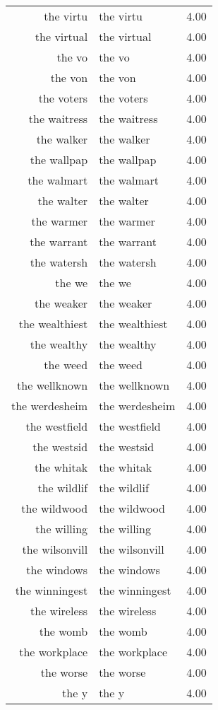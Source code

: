 \begin{table}[ht]
\begin{tabular}{rlr}
  the virtu & the virtu & 4.00 \\ 
  the virtual & the virtual & 4.00 \\ 
  the vo & the vo & 4.00 \\ 
  the von & the von & 4.00 \\ 
  the voters & the voters & 4.00 \\ 
  the waitress & the waitress & 4.00 \\ 
  the walker & the walker & 4.00 \\ 
  the wallpap & the wallpap & 4.00 \\ 
  the walmart & the walmart & 4.00 \\ 
  the walter & the walter & 4.00 \\ 
  the warmer & the warmer & 4.00 \\ 
  the warrant & the warrant & 4.00 \\ 
  the watersh & the watersh & 4.00 \\ 
  the we & the we & 4.00 \\ 
  the weaker & the weaker & 4.00 \\ 
  the wealthiest & the wealthiest & 4.00 \\ 
  the wealthy & the wealthy & 4.00 \\ 
  the weed & the weed & 4.00 \\ 
  the wellknown & the wellknown & 4.00 \\ 
  the werdesheim & the werdesheim & 4.00 \\ 
  the westfield & the westfield & 4.00 \\ 
  the westsid & the westsid & 4.00 \\ 
  the whitak & the whitak & 4.00 \\ 
  the wildlif & the wildlif & 4.00 \\ 
  the wildwood & the wildwood & 4.00 \\ 
  the willing & the willing & 4.00 \\ 
  the wilsonvill & the wilsonvill & 4.00 \\ 
  the windows & the windows & 4.00 \\ 
  the winningest & the winningest & 4.00 \\ 
  the wireless & the wireless & 4.00 \\ 
  the womb & the womb & 4.00 \\ 
  the workplace & the workplace & 4.00 \\ 
  the worse & the worse & 4.00 \\ 
  the y & the y & 4.00 \\ 

\end{tabular}
\end{table}
